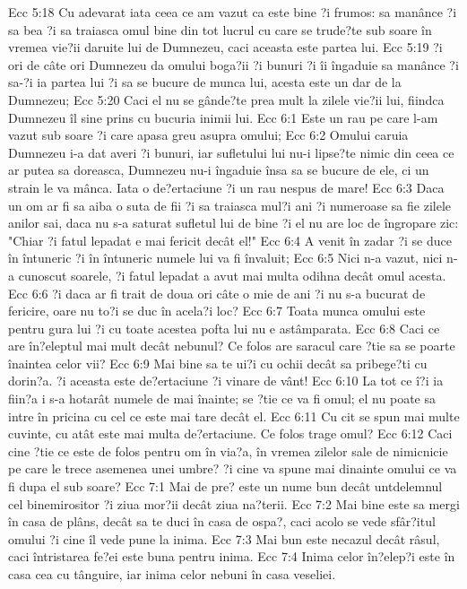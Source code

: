 Ecc 5:18  Cu adevarat iata ceea ce am vazut ca este bine ?i frumos: sa manânce ?i sa bea ?i sa traiasca omul bine din tot lucrul cu care se trude?te sub soare în vremea vie?ii daruite lui de Dumnezeu, caci aceasta este partea lui.
Ecc 5:19  ?i ori de câte ori Dumnezeu da omului boga?ii ?i bunuri ?i îi îngaduie sa manânce ?i sa-?i ia partea lui ?i sa se bucure de munca lui, acesta este un dar de la Dumnezeu;
Ecc 5:20  Caci el nu se gânde?te prea mult la zilele vie?ii lui, fiindca Dumnezeu îl sine prins cu bucuria inimii lui.
Ecc 6:1  Este un rau pe care l-am vazut sub soare ?i care apasa greu asupra omului;
Ecc 6:2  Omului caruia Dumnezeu i-a dat averi ?i bunuri, iar sufletului lui nu-i lipse?te nimic din ceea ce ar putea sa doreasca, Dumnezeu nu-i îngaduie însa sa se bucure de ele, ci un strain le va mânca. Iata o de?ertaciune ?i un rau nespus de mare!
Ecc 6:3  Daca un om ar fi sa aiba o suta de fii ?i sa traiasca mul?i ani ?i numeroase sa fie zilele anilor sai, daca nu s-a saturat sufletul lui de bine ?i el nu are loc de îngropare zic: "Chiar ?i fatul lepadat e mai fericit decât el!"
Ecc 6:4  A venit în zadar ?i se duce în întuneric ?i în întuneric numele lui va fi învaluit;
Ecc 6:5  Nici n-a vazut, nici n-a cunoscut soarele, ?i fatul lepadat a avut mai multa odihna decât omul acesta.
Ecc 6:6  ?i daca ar fi trait de doua ori câte o mie de ani ?i nu s-a bucurat de fericire, oare nu to?i se duc în acela?i loc?
Ecc 6:7  Toata munca omului este pentru gura lui ?i cu toate acestea pofta lui nu e astâmparata.
Ecc 6:8  Caci ce are în?eleptul mai mult decât nebunul? Ce folos are saracul care ?tie sa se poarte înaintea celor vii?
Ecc 6:9  Mai bine sa te ui?i cu ochii decât sa pribege?ti cu dorin?a. ?i aceasta este de?ertaciune ?i vinare de vânt!
Ecc 6:10  La tot ce î?i ia fiin?a i s-a hotarât numele de mai înainte; se ?tie ce va fi omul; el nu poate sa intre în pricina cu cel ce este mai tare decât el.
Ecc 6:11  Cu cit se spun mai multe cuvinte, cu atât este mai multa de?ertaciune. Ce folos trage omul?
Ecc 6:12  Caci cine ?tie ce este de folos pentru om în via?a, în vremea zilelor sale de nimicnicie pe care le trece asemenea unei umbre? ?i cine va spune mai dinainte omului ce va fi dupa el sub soare?
Ecc 7:1  Mai de pre? este un nume bun decât untdelemnul cel binemirositor ?i ziua mor?ii decât ziua na?terii.
Ecc 7:2  Mai bine este sa mergi în casa de plâns, decât sa te duci în casa de ospa?, caci acolo se vede sfâr?itul omului ?i cine îl vede pune la inima.
Ecc 7:3  Mai bun este necazul decât râsul, caci întristarea fe?ei este buna pentru inima.
Ecc 7:4  Inima celor în?elep?i este în casa cea cu tânguire, iar inima celor nebuni în casa veseliei.
